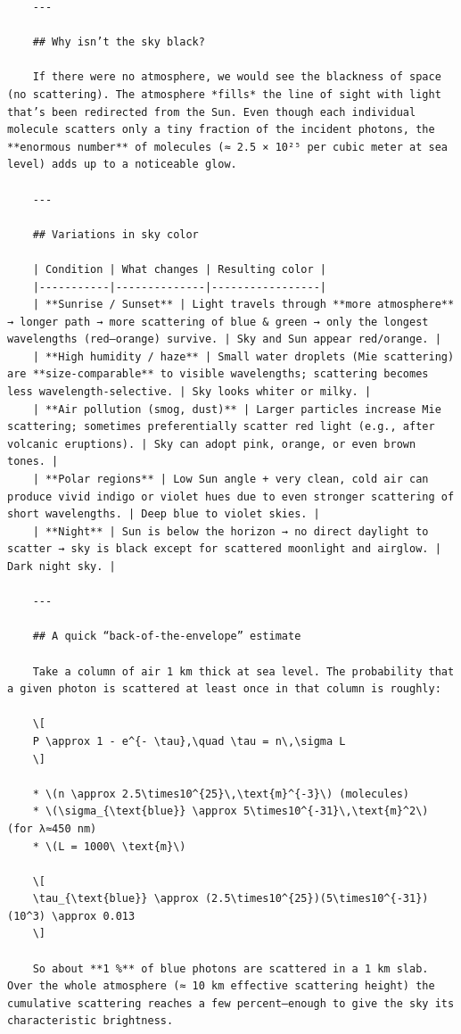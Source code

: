 \begin{verbatim}
    ---
    
    ## Why isn’t the sky black?
    
    If there were no atmosphere, we would see the blackness of space (no scattering). The atmosphere *fills* the line of sight with light that’s been redirected from the Sun. Even though each individual molecule scatters only a tiny fraction of the incident photons, the **enormous number** of molecules (≈ 2.5 × 10²⁵ per cubic meter at sea level) adds up to a noticeable glow.
    
    ---
    
    ## Variations in sky color
    
    | Condition | What changes | Resulting color |
    |-----------|--------------|-----------------|
    | **Sunrise / Sunset** | Light travels through **more atmosphere** → longer path → more scattering of blue & green → only the longest wavelengths (red–orange) survive. | Sky and Sun appear red/orange. |
    | **High humidity / haze** | Small water droplets (Mie scattering) are **size‑comparable** to visible wavelengths; scattering becomes less wavelength‑selective. | Sky looks whiter or milky. |
    | **Air pollution (smog, dust)** | Larger particles increase Mie scattering; sometimes preferentially scatter red light (e.g., after volcanic eruptions). | Sky can adopt pink, orange, or even brown tones. |
    | **Polar regions** | Low Sun angle + very clean, cold air can produce vivid indigo or violet hues due to even stronger scattering of short wavelengths. | Deep blue to violet skies. |
    | **Night** | Sun is below the horizon → no direct daylight to scatter → sky is black except for scattered moonlight and airglow. | Dark night sky. |
    
    ---
    
    ## A quick “back‑of‑the‑envelope” estimate
    
    Take a column of air 1 km thick at sea level. The probability that a given photon is scattered at least once in that column is roughly:
    
    \[
    P \approx 1 - e^{- \tau},\quad \tau = n\,\sigma L
    \]
    
    * \(n \approx 2.5\times10^{25}\,\text{m}^{-3}\) (molecules)  
    * \(\sigma_{\text{blue}} \approx 5\times10^{-31}\,\text{m}^2\) (for λ≈450 nm)  
    * \(L = 1000\ \text{m}\)
    
    \[
    \tau_{\text{blue}} \approx (2.5\times10^{25})(5\times10^{-31})(10^3) \approx 0.013
    \]
    
    So about **1 %** of blue photons are scattered in a 1 km slab. Over the whole atmosphere (≈ 10 km effective scattering height) the cumulative scattering reaches a few percent—enough to give the sky its characteristic brightness.
    

\end{verbatim}
